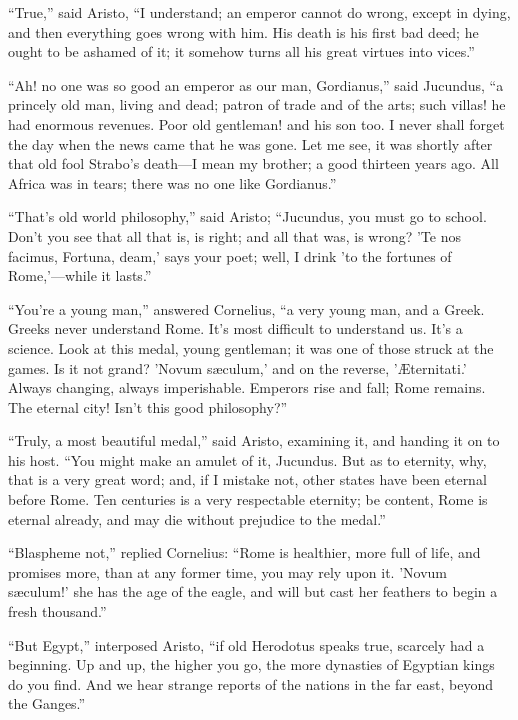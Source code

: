 ``True,'' said Aristo, ``I understand; an emperor
cannot do wrong, except in dying, and then everything goes wrong with
him. His death is his first bad deed; he ought to be ashamed of it; it
somehow turns all his great virtues into vices.''

``Ah! no one was so good an emperor as our man, Gordianus,''
said Jucundus, ``a princely old man, living and dead; patron of
trade and of the arts; such villas! he had enormous revenues. Poor old
gentleman! and his son too. I never shall forget the day when the news
came that he was gone. Let me see, it was shortly after that old fool
Strabo's death—I mean my brother; a good thirteen years ago. All
Africa was in tears; there was no one like Gordianus.''

``That's old world philosophy,'' said Aristo; ``Jucundus,
you must go to school. Don't you see that all that is, is right; and
all that was, is wrong? 'Te nos facimus, Fortuna, deam,' says your
poet; well, I drink 'to the fortunes of Rome,'—while it
lasts.''

``You're a young man,'' answered Cornelius, ``a very
young man, and a Greek. Greeks never understand Rome. It's most
difficult to understand us. It's a science. Look at this medal,
young gentleman; it was one of those struck at the games. Is it not
grand? 'Novum sæculum,' and on the reverse, 'Æternitati.'
Always changing, always imperishable. Emperors rise and fall; Rome
remains. The eternal city! Isn't this good philosophy?''

``Truly, a most beautiful medal,'' said Aristo, examining
it, and handing it on to his host. ``You might make an amulet of
it, Jucundus. But as to eternity, why, that is a very great word; and,
if I mistake not, other states have been eternal before Rome. Ten
centuries is a very respectable eternity; be content, Rome is eternal
already, and may die without prejudice to the medal.''

``Blaspheme not,'' replied Cornelius: ``Rome is
healthier, more full of life, and promises more, than at any former
time, you may rely upon it. 'Novum sæculum!' she has the age of
the eagle, and will but cast her feathers to begin a fresh
thousand.''

``But Egypt,'' interposed Aristo, ``if old Herodotus
speaks true, scarcely had a beginning. Up and up, the higher you
go, the more dynasties of Egyptian kings do you find. And we hear
strange reports of the nations in the far east, beyond the
Ganges.''

